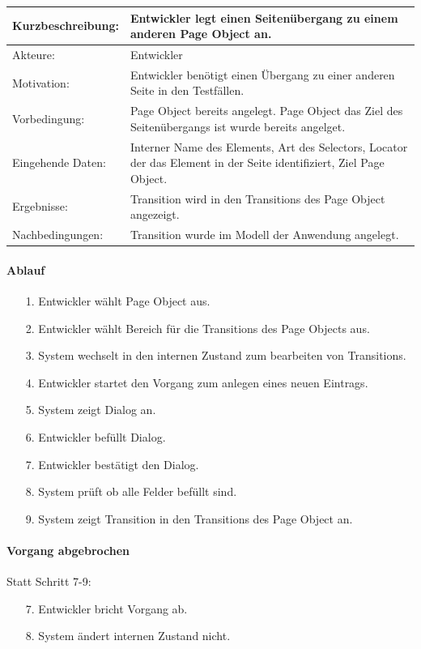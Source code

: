 \begin{tabular}[h]{|p{4cm}|p{}|}
\hline 
\rule[-1ex]{0pt}{2.5ex}Kurzbeschreibung: & 
Entwickler legt einen Seitenübergang zu einem anderen Page Object an. \\  
\hline 
\rule[-1ex]{0pt}{2.5ex}Akteure: & 
Entwickler \\ 
\hline 
\rule[-1ex]{0pt}{2.5ex}Motivation: & 
Entwickler benötigt einen Übergang zu einer anderen Seite in den Testfällen. \\ 
\hline 
\rule[-1ex]{0pt}{2.5ex}Vorbedingung: & 
Page Object bereits angelegt. Page Object das Ziel des Seitenübergangs ist wurde bereits angelget.\\ 
\hline 
\rule[-1ex]{0pt}{2.5ex}Eingehende Daten: & Interner Name des Elements, Art des Selectors, Locator der das Element in der Seite identifiziert, Ziel Page Object. \\ 
\hline 
\rule[-1ex]{0pt}{2.5ex}Ergebnisse: & Transition wird in den Transitions des Page Object angezeigt. \\ 
\hline 
\rule[-1ex]{0pt}{2.5ex}Nachbedingungen: & Transition wurde im Modell der Anwendung angelegt.  \\ 
\hline 
\end{tabular} 

\paragraph{Ablauf}

\begin{itemize}[itemsep=0pt]
\item[1.] Entwickler wählt Page Object aus.
\item[2.] Entwickler wählt Bereich für die Transitions des Page Objects aus. 
\item[3.] System wechselt in den internen Zustand zum bearbeiten von Transitions.
\item[4.] Entwickler startet den Vorgang zum anlegen eines neuen Eintrags.
\item[5.] System zeigt Dialog an. 
\item[6.] Entwickler befüllt Dialog.
\item[7.] Entwickler bestätigt den Dialog.
\item[8.] System prüft ob alle Felder befüllt sind.
\item[9.] System zeigt Transition in den Transitions des Page Object an.
\end{itemize}

\paragraph{Vorgang abgebrochen}
Statt Schritt 7-9:
\begin{itemize}[itemsep=0pt]
\item[7.] Entwickler bricht Vorgang ab. 
\item[8.] System ändert internen Zustand nicht. 
\end{itemize}

